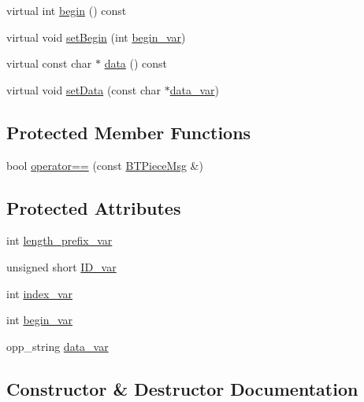 \begin{DoxyCompactItemize}
\item 
virtual int \hyperlink{classBTPieceMsg_a2d78a296cd35afe5da527cc6f1866e80}{begin} () const 
\item 
virtual void \hyperlink{classBTPieceMsg_aa17191c3a4c9706e161294a223c15393}{set\+Begin} (int \hyperlink{classBTPieceMsg_a0d1fed26edc84d361d74986fa4593c71}{begin\+\_\+var})
\item 
virtual const char $\ast$ \hyperlink{classBTPieceMsg_a39e81e0d245415035f119c31dbc54723}{data} () const 
\item 
virtual void \hyperlink{classBTPieceMsg_aa0628ba79c3d9f027c0a64f8f58bd6bb}{set\+Data} (const char $\ast$\hyperlink{classBTPieceMsg_ab0ce35b2c10df0e33900776ce415473d}{data\+\_\+var})
\end{DoxyCompactItemize}
\subsection*{Protected Member Functions}
\begin{DoxyCompactItemize}
\item 
bool \hyperlink{classBTPieceMsg_a2a30af287383c392ef5abbc77a201b35}{operator==} (const \hyperlink{classBTPieceMsg}{B\+T\+Piece\+Msg} \&)
\end{DoxyCompactItemize}
\subsection*{Protected Attributes}
\begin{DoxyCompactItemize}
\item 
int \hyperlink{classBTPieceMsg_a003b938dabb53ea470ef14fee77ce17c}{length\+\_\+prefix\+\_\+var}
\item 
unsigned short \hyperlink{classBTPieceMsg_aa46d6993c9d02a3b4add2a69b811de48}{I\+D\+\_\+var}
\item 
int \hyperlink{classBTPieceMsg_a5caacefaece64a71bc6b5e209e4d13a0}{index\+\_\+var}
\item 
int \hyperlink{classBTPieceMsg_a0d1fed26edc84d361d74986fa4593c71}{begin\+\_\+var}
\item 
opp\+\_\+string \hyperlink{classBTPieceMsg_ab0ce35b2c10df0e33900776ce415473d}{data\+\_\+var}
\end{DoxyCompactItemize}


\subsection{Constructor \& Destructor Documentation}
\hypertarget{classBTPieceMsg_aab94a7d9cecf74bbcb4d33c73621e79d}{}
